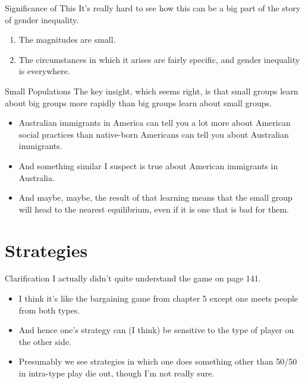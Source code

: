 \documentclass[
  ignorenonframetext,
]{beamer}
\providecommand{\tightlist}{%
  \setlength{\itemsep}{0pt}\setlength{\parskip}{0pt}}
\begin{document}
\begin{frame}{Significance of This}
\protect\hypertarget{significance-of-this}{}
It's really hard to see how this can be a big part of the story of
gender inequality.

\begin{enumerate}[<+->]
\tightlist
\item
  The magnitudes are small.
\item
  The circumstances in which it arises are fairly specific, and gender
  inequality is everywhere.
\end{enumerate}
\end{frame}

\begin{frame}{Small Populations}
\protect\hypertarget{small-populations}{}
The key insight, which seems right, is that small groups learn about big
groups more rapidly than big groups learn about small groups.

\begin{itemize}
\tightlist
\item
  Australian immigrants in America can tell you a lot more about
  American social practices than native-born Americans can tell you
  about Australian immigrants.
\item
  And something similar I suspect is true about American immigrants in
  Australia.
\item
  And maybe, maybe, the result of that learning means that the small
  group will head to the nearest equilibrium, even if it is one that is
  bad for them.
\end{itemize}
\end{frame}

\hypertarget{strategies}{%
\section{Strategies}\label{strategies}}

\begin{frame}{Clarification}
\protect\hypertarget{clarification}{}
I actually didn't quite understand the game on page 141.

\begin{itemize}
\tightlist
\item
  I think it's like the bargaining game from chapter 5 except one meets
  people from both types.
\item
  And hence one's strategy can (I think) be sensitive to the type of
  player on the other side.
\item
  Presumably we see strategies in which one does something other than
  50/50 in intra-type play die out, though I'm not really sure.
\end{itemize}
\end{frame}
\end{document}
